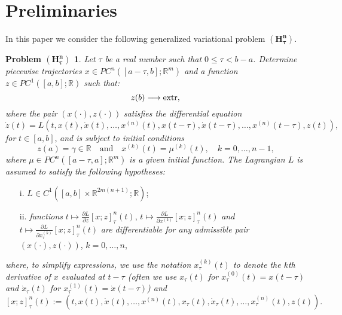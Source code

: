 \documentclass{my-aims}
\theoremstyle{definition}
\newtheorem*{problem}{Problem $\mathbf{(H_\tau^n)}$}
\begin{document}

\section{Preliminaries}
\label{sec:prelim}

In this paper we consider the following generalized 
variational problem $\mathbf{(H_\tau^n)}$.
\begin{problem}
\textit{Let $\tau$ be a real number such that $0\leq \tau<b-a$.
Determine piecewise trajectories $x\in PC^n([a-\tau,b];\mathbb{R}^m)$
and a function $z\in PC^1([a,b];\mathbb{R})$ such that:}
\begin{equation*}
z(b)\longrightarrow \mathrm{extr},\\
\end{equation*}
\textit{where the pair} $(x(\cdot),z(\cdot))$
\textit{satisfies the differential equation}
\begin{equation*}
\dot{z}(t)=L\left(t,x(t),\dot{x}(t),\dots, x^{(n)}(t),
x(t-\tau),\dot{x}(t-\tau),\dots, x^{(n)}(t-\tau),z(t)\right),
\end{equation*}
\textit{for} $t \in [a,b]$, \textit{and is subject to initial conditions}
\begin{equation*}
z(a)=\gamma \in \mathbb{R} \quad  \text{and} \quad 
x^{(k)}(t)=\mu^{(k)}(t), \quad k=0,\dots,n-1,
\end{equation*}
\textit{where} $\mu \in PC^n ([a-\tau,a];\mathbb{R}^m)$
\textit{ is a given initial function. The Lagrangian
$L$ is assumed to satisfy the following hypotheses:}
\begin{itemize}
\item[i.] $L \in C^1([a,b]\times\mathbb{R}^{2m(n+1)}; \mathbb{R})$;

\item[ii.] \textit{functions} $t \mapsto
\frac{\partial L}{\partial z}[x;z]_\tau^n(t)$,
$t\mapsto \frac{\partial L}{\partial x^{(k)}}[x;z]_\tau^n(t)$
\textit{and} $t\mapsto \frac{\partial L}{\partial x_\tau^{(k)}}[x;z]_\tau^n(t)$
\textit{are differentiable for any admissible pair}
$(x(\cdot),z(\cdot))$, $k=0,\dots,n$,
\end{itemize}
\textit{where, to simplify expressions, we use the notation
$x_\tau^{(k)}(t)$ to denote the $k$th derivative
of $x$ evaluated at $t-\tau$ (often we use
$x_\tau(t)$ for $x_\tau^{(0)}(t) = x(t-\tau)$ and
$\dot{x}_\tau(t)$ for $x_\tau^{(1)}(t) = \dot{x}(t-\tau)$) and
$$
[x;z]^n_\tau(t):=\left(t,x(t),\dot{x}(t),
\dots, x^{(n)}(t), x_\tau(t),\dot{x}_\tau(t),\dots, x_\tau^{(n)}(t),z(t)\right).
$$}
\end{problem}
\end{document}
